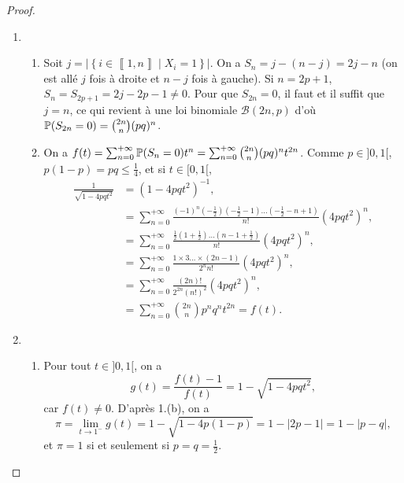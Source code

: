 \documentclass[12pt]{article}
\begin{document}
\begin{proof}
\begin{enumerate}
        \item 
        \begin{enumerate}
            \item Soit $j=\left\lvert\left\lbrace i\in\left\llbracket1,n\right\rrbracket\middle|X_i=1\right\rbrace\right\rvert$. On a $S_n=j-(n-j)=2j-n$ (on est allé $j$ fois à droite et $n-j$ fois à gauche). Si $n=2p+1$, $S_n=S_{2p+1}=2j-2p-1\neq0$. Pour que $S_{2n}=0$, il faut et il suffit que $j=n$, ce qui revient à une loi binomiale $\mathcal{B}(2n,p)$ d'où $\P(S_{2n}=0)=\binom{2n}{n}(pq)^{n}$.
            
            \item On a $f(t)=\sum_{n=0}^{+\infty}\P(S_n=0)t^{n}=\sum_{n=0}^{+\infty}\binom{2n}{n}(pq)^{n}t^{2n}$. Comme $p\in]0,1[$, $p(1-p)=pq\leqslant\frac{1}{4}$, et si $t\in[0,1[$, 
            \begin{align}
                \frac{1}{\sqrt{1-4pqt^{2}}}
                &=(1-4pqt^{2})^{-1},\\
                &=\sum_{n=0}^{+\infty}\frac{(-1)^{n}\left(-\frac{1}{2}\right)\left(-\frac{1}{2}-1\right)\dots\left(-\frac{1}{2}-n+1\right)}{n!}(4pqt^{2})^{n},\\
                &=\sum_{n=0}^{+\infty}\frac{\frac{1}{2}\left(1+\frac{1}{2}\right)\dots\left(n-1+\frac{1}{2}\right)}{n!}(4pqt^{2})^{n},\\
                &=\sum_{n=0}^{+\infty}\frac{1\times 3\dots \times (2n-1)}{2^{n}n!}(4pqt^{2})^{n},\\
                &=\sum_{n=0}^{+\infty}\frac{(2n)!}{2^{2n}(n!)^{2}}(4pqt^{2})^{n},\\
                &=\sum_{n=0}^{+\infty}\binom{2n}{n}p^{n}q^{n}t^{2n}=f(t).
            \end{align}
        \end{enumerate}

        \item 
        \begin{enumerate}
            \item Pour tout $t\in]0,1[$, on a 
            \begin{equation}
                g(t)=\frac{f(t)-1}{f(t)}=1-\sqrt{1-4pqt^{2}},
            \end{equation}
            car $f(t)\neq0$. D'après 1.(b), on a 
            \begin{equation}
                \pi=\lim\limits_{t\to1^{-}}g(t)=1-\sqrt{1-4p(1-p)}=1-\left\lvert 2p-1\right\rvert=1-\left\lvert p-q\right\rvert,
            \end{equation}
            et $\pi=1$ si et seulement si $p=q=\frac{1}{2}$.


\end{enumerate}
\end{enumerate}
\end{proof}
\end{document}
